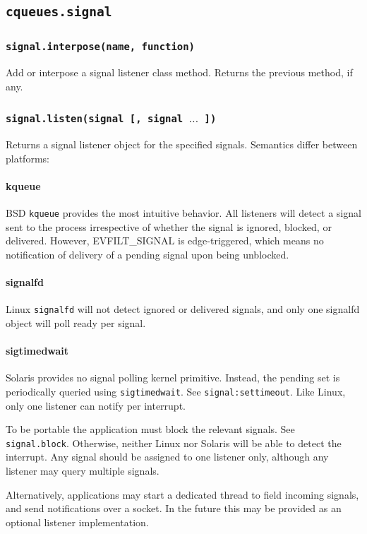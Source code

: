 \documentclass[11pt, oneside]{memoir}
\newcommand*{\syscall}[1]{\texttt{#1}\xspace}
\newcommand*{\fn}[1]{\texttt{#1}\xspace}
\newcommand*{\method}[1]{\texttt{#1}\xspace}
\newcounter{toccols}
\newenvironment{Module}[1]{
	\subsection{\texttt{#1}}
	\addtocontents{toc}{
		\protect\begin{multicols}{\value{toccols}}
	}
}{
	\addtocontents{toc}{\protect\end{multicols}}
}
\begin{document}
\begin{Module}{cqueues.signal}
\subsubsection[\fn{signal.interpose}]{\fn{signal.interpose(name, function)}}
Add or interpose a signal listener class method. Returns the previous method, if any.

\subsubsection[\fn{signal.listen}]{\fn{signal.listen(signal [, signal $\ldots$ ])}}
Returns a signal listener object for the specified signals. Semantics differ between platforms:

\paragraph{kqueue}
BSD \syscall{kqueue} provides the most intuitive behavior. All listeners will detect a signal sent to the process irrespective of whether the signal is ignored, blocked, or delivered. However, EVFILT\_SIGNAL is edge-triggered, which means no notification of delivery of a pending signal upon being unblocked.

\paragraph{signalfd}
Linux \syscall{signalfd} will not detect ignored or delivered signals, and only one signalfd object will poll ready per signal.

\paragraph{sigtimedwait}
Solaris provides no signal polling kernel primitive. Instead, the pending set is periodically queried using \syscall{sigtimedwait}. See \method{signal:settimeout}. Like Linux, only one listener can notify per interrupt.

To be portable the application must block the relevant signals. See \fn{signal.block}. Otherwise, neither Linux nor Solaris will be able to detect the interrupt. Any signal should be assigned to one listener only, although any listener may query multiple signals.

Alternatively, applications may start a dedicated thread to field incoming signals, and send notifications over a socket. In the future this may be provided as an optional listener implementation.


\end{Module}
\end{document}
